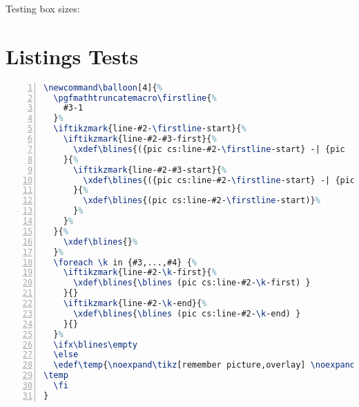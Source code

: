 \documentclass[a4paper]{article}
\begin{document}
Testing box sizes:



\section{Listings Tests}


\newcommand\balloon[4]{%
  \pgfmathtruncatemacro\firstline{%
    #3-1
  }%
  \iftikzmark{line-#2-\firstline-start}{%
    \iftikzmark{line-#2-#3-first}{%
      \xdef\blines{({pic cs:line-#2-\firstline-start} -| {pic           cs:line-#2-#3-first})}%
    }{%
      \iftikzmark{line-#2-#3-start}{%
        \xdef\blines{({pic cs:line-#2-\firstline-start} -| {pic             cs:line-#2-#3-start})}%
      }{%
        \xdef\blines{(pic cs:line-#2-\firstline-start)}%
      }%
    }%
  }{%
    \xdef\blines{}%
  }%
  \foreach \k in {#3,...,#4} {%
    \iftikzmark{line-#2-\k-first}{%
      \xdef\blines{\blines (pic cs:line-#2-\k-first) }
    }{}
    \iftikzmark{line-#2-\k-end}{%
      \xdef\blines{\blines (pic cs:line-#2-\k-end) }
    }{}
  }%
  \ifx\blines\empty
  \else
  \edef\temp{\noexpand\tikz[remember picture,overlay]\noexpand\node[fit={\blines},balloon] (#1) {};}%
\temp
  \fi
}


\begin{lstlisting}[language=TeX,name=texcode,numbers=left,breakatwhitespace=true,breaklines=true]
\newcommand\balloon[4]{%
  \pgfmathtruncatemacro\firstline{%
    #3-1
  }%
  \iftikzmark{line-#2-\firstline-start}{%
    \iftikzmark{line-#2-#3-first}{%
      \xdef\blines{({pic cs:line-#2-\firstline-start} -| {pic           cs:line-#2-#3-first})}%
    }{%
      \iftikzmark{line-#2-#3-start}{%
        \xdef\blines{({pic cs:line-#2-\firstline-start} -| {pic             cs:line-#2-#3-start})}%
      }{%
        \xdef\blines{(pic cs:line-#2-\firstline-start)}%
      }%
    }%
  }{%
    \xdef\blines{}%
  }%
  \foreach \k in {#3,...,#4} {%
    \iftikzmark{line-#2-\k-first}{%
      \xdef\blines{\blines (pic cs:line-#2-\k-first) }
    }{}
    \iftikzmark{line-#2-\k-end}{%
      \xdef\blines{\blines (pic cs:line-#2-\k-end) }
    }{}
  }%
  \ifx\blines\empty
  \else
  \edef\temp{\noexpand\tikz[remember picture,overlay] \noexpand\node[fit={\blines},balloon] (#1) {};}%
\temp
  \fi
}
\end{lstlisting}
\end{document}
